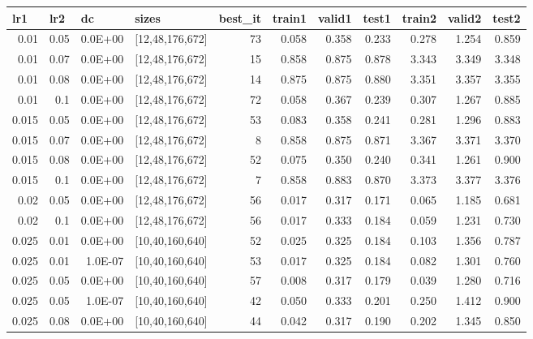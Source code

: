 \begin{table}[f]
\label{tab:results}
\small
\begin{tabular}{@{}rrrrrrrrrrr@{}}
\toprule
\multicolumn{1}{l}{lr1} & \multicolumn{1}{l}{lr2} & \multicolumn{1}{l}{dc} & \multicolumn{1}{l}{sizes} & \multicolumn{1}{l}{best\_it} & \multicolumn{1}{l}{train1} & \multicolumn{1}{l}{valid1} & \multicolumn{1}{l}{test1} & \multicolumn{1}{l}{train2} & \multicolumn{1}{l}{valid2} & \multicolumn{1}{l}{test2} \\ \midrule
0.01 & 0.05 & 0.0E+00 & {[}12,48,176,672{]} & 73 & 0.058 & 0.358 & 0.233 & 0.278 & 1.254 & 0.859 \\
0.01 & 0.07 & 0.0E+00 & {[}12,48,176,672{]} & 15 & 0.858 & 0.875 & 0.878 & 3.343 & 3.349 & 3.348 \\
0.01 & 0.08 & 0.0E+00 & {[}12,48,176,672{]} & 14 & 0.875 & 0.875 & 0.880 & 3.351 & 3.357 & 3.355 \\
0.01 & 0.1 & 0.0E+00 & {[}12,48,176,672{]} & 72 & 0.058 & 0.367 & 0.239 & 0.307 & 1.267 & 0.885 \\
0.015 & 0.05 & 0.0E+00 & {[}12,48,176,672{]} & 53 & 0.083 & 0.358 & 0.241 & 0.281 & 1.296 & 0.883 \\
0.015 & 0.07 & 0.0E+00 & {[}12,48,176,672{]} & 8 & 0.858 & 0.875 & 0.871 & 3.367 & 3.371 & 3.370 \\
0.015 & 0.08 & 0.0E+00 & {[}12,48,176,672{]} & 52 & 0.075 & 0.350 & 0.240 & 0.341 & 1.261 & 0.900 \\
0.015 & 0.1 & 0.0E+00 & {[}12,48,176,672{]} & 7 & 0.858 & 0.883 & 0.870 & 3.373 & 3.377 & 3.376 \\
0.02 & 0.05 & 0.0E+00 & {[}12,48,176,672{]} & 56 & 0.017 & 0.317 & 0.171 & 0.065 & 1.185 & 0.681 \\
0.02 & 0.1 & 0.0E+00 & {[}12,48,176,672{]} & 56 & 0.017 & 0.333 & 0.184 & 0.059 & 1.231 & 0.730 \\
0.025 & 0.01 & 0.0E+00 & {[}10,40,160,640{]} & 52 & 0.025 & 0.325 & 0.184 & 0.103 & 1.356 & 0.787 \\
0.025 & 0.01 & 1.0E-07 & {[}10,40,160,640{]} & 53 & 0.017 & 0.325 & 0.184 & 0.082 & 1.301 & 0.760 \\
0.025 & 0.05 & 0.0E+00 & {[}10,40,160,640{]} & 57 & 0.008 & 0.317 & 0.179 & 0.039 & 1.280 & 0.716 \\
0.025 & 0.05 & 1.0E-07 & {[}10,40,160,640{]} & 42 & 0.050 & 0.333 & 0.201 & 0.250 & 1.412 & 0.900 \\
0.025 & 0.08 & 0.0E+00 & {[}10,40,160,640{]} & 44 & 0.042 & 0.317 & 0.190 & 0.202 & 1.345 & 0.850 \\

\end{tabular}
\end{table}

